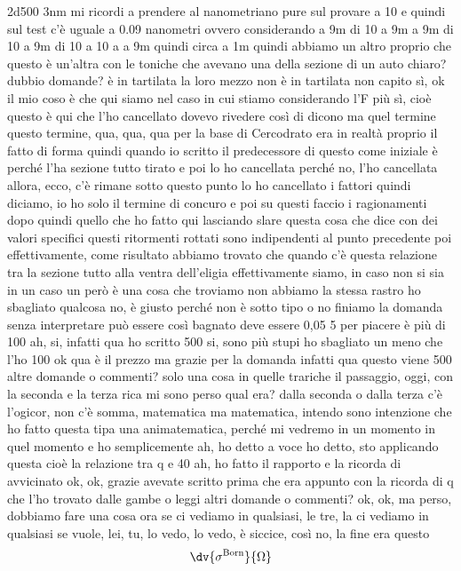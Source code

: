 \begin{soluzione}
{   2d500 3nm mi ricordi a prendere al nanometriano pure sul provare a 10 e quindi sul test c'è uguale a 0.09 nanometri ovvero considerando a 9m di 10 a 9m a 9m di 10 a 9m di 10 a 10 a a 9m quindi circa a 1m quindi abbiamo un altro proprio che questo è un'altra con le toniche che avevano una della sezione di un auto chiaro? dubbio domande? è in tartilata la loro mezzo non è in tartilata non capito sì, ok il mio coso è che qui siamo nel caso in cui stiamo considerando l'F più sì, cioè questo è qui che l'ho cancellato dovevo rivedere così di dicono ma quel termine questo termine, qua, qua, qua per la base di Cercodrato era in realtà proprio il fatto di forma quindi quando io scritto il predecessore di questo come iniziale è perché l'ha sezione tutto tirato e poi lo ho cancellata perché no, l'ho cancellata allora, ecco, c'è rimane sotto questo punto lo ho cancellato i fattori quindi diciamo, io ho solo il termine di concuro e poi su questi faccio i ragionamenti dopo quindi quello che ho fatto qui lasciando slare questa cosa che dice con dei valori specifici questi ritormenti rottati sono indipendenti al punto precedente poi effettivamente, come risultato abbiamo trovato che quando c'è questa relazione tra la sezione tutto alla ventra dell'eligia effettivamente siamo, in caso non si sia in un caso un però è una cosa che troviamo non abbiamo la stessa rastro ho sbagliato qualcosa no, è giusto perché non è sotto tipo o no finiamo la domanda senza interpretare può essere così bagnato deve essere 0,05 5 per piacere è più di 100 ah, si, infatti qua ho scritto 500 si, sono più stupi ho sbagliato un meno che l'ho 100 ok qua è il prezzo ma grazie per la domanda infatti qua questo viene 500 altre domande o commenti? solo una cosa in quelle trariche il passaggio, oggi, con la seconda e la terza rica mi sono perso qual era? dalla seconda o dalla terza c'è l'ogicor, non c'è somma, matematica ma matematica, intendo sono intenzione che ho fatto questa tipa una animatematica, perché mi vedremo in un momento in quel momento e ho semplicemente ah, ho detto a voce ho detto, sto applicando questa cioè la relazione tra q e 40 ah, ho fatto il rapporto e la ricorda di avvicinato ok, ok, grazie avevate scritto prima che era appunto con la ricorda di q che l'ho trovato dalle gambe o leggi altri domande o commenti? ok, ok, ma perso, dobbiamo fare una cosa ora se ci vediamo in qualsiasi, le tre, la ci vediamo in qualsiasi se vuole, lei, tu, lo vedo, lo vedo, è siccice, così no, la fine era questo
   \begin{equation*}
      \dv{\sigma^{\rm Born}}{\Omega}

\end{equation*}}
\end{soluzione}
